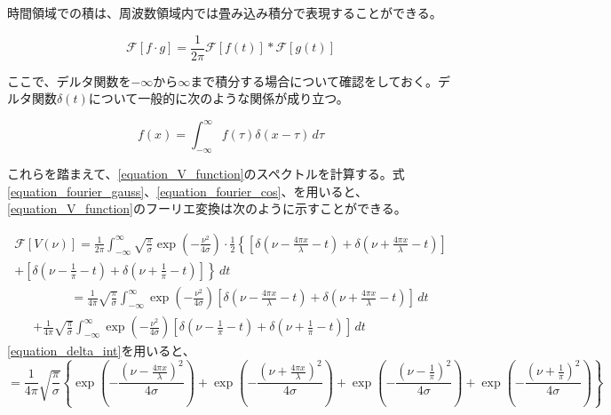 \documentclass[uplatex, titlepage, fontsize=10pt, paper=a4paper]{jsarticle}
\numberwithin{equation}{section}
\begin{document}
時間領域での積は、周波数領域内では畳み込み積分で表現することができる。\cite{mathema_Fourier}

\begin{equation}
    \mathcal{F}\left[f\cdot g\right] = \frac{1}{2\pi}\mathcal{F}\left[f(t)\right]\ast \mathcal{F}\left[g(t)\right]
\end{equation}

ここで、デルタ関数を$-\infty$から$\infty$まで積分する場合について確認をしておく。デルタ関数$\delta(t)$について一般的に次のような関係が成り立つ。

\begin{equation}
    f(x)=\int_{-\infty}^{\infty } f(\tau)\delta(x-\tau) \,d\tau 
    \label{equation_delta_int}
\end{equation}

これらを踏まえて、\eqref{equation_V_function}のスペクトルを計算する。式\ref{equation_fourier_gauss}、\eqref{equation_fourier_cos}、を用いると、\eqref{equation_V_function}のフーリエ変換は次のように示すことができる。

\begin{multline}
    \mathcal{F}\left[V(\nu)\right] = \frac{1}{2\pi}\int_{-\infty}^{\infty}\sqrt{\frac{\pi}{\sigma}}\exp\left({-\frac{\nu^2}{4\sigma}}\right)\cdot \frac{1}{2} \left\{\left[\delta\left(\nu-\frac{4{\pi}x}{\lambda}-t\right)+\delta\left(\nu+\frac{4{\pi}x}{\lambda}-t\right)\right]\right. \\
    +\left.\left[\delta\left(\nu-\frac{1}{\pi}-t\right)+\delta\left(\nu+\frac{1}{\pi}-t\right)\right]\right\}\,dt
\end{multline}
\begin{multline}
    \qquad \quad =\frac{1}{4\pi}\sqrt{\frac{\pi}{\sigma}}\int_{-\infty}^{\infty}\exp\left({-\frac{\nu^2}{4\sigma}}\right)\left[\delta\left(\nu-\frac{4{\pi}x}{\lambda}-t\right)+\delta\left(\nu+\frac{4{\pi}x}{\lambda}-t\right)\right] \,dt\\
    +\frac{1}{4\pi}\sqrt{\frac{\pi}{\sigma}}\int_{-\infty}^{\infty} \exp\left({-\frac{\nu^2}{4\sigma}}\right) \left[\delta\left(\nu-\frac{1}{\pi}-t\right)+\delta\left(\nu+\frac{1}{\pi}-t\right)\right]\,dt 
    \label{equation_fourier_V}
\end{multline}
\vspace{3mm}
\eqref{equation_delta_int}を用いると、
\begin{equation}
    =\frac{1}{4\pi}\sqrt{\frac{\pi}{\sigma}}\left\{\exp\left(-\frac{(\nu-\frac{4{\pi}x}{\lambda})^2}{4\sigma}\right)+\exp\left(-\frac{(\nu+\frac{4{\pi}x}{\lambda})^2}{4\sigma}\right)+\exp\left(-\frac{(\nu-\frac{1}{\pi})^2}{4\sigma}\right)+\exp\left(-\frac{(\nu+\frac{1}{\pi})^2}{4\sigma}\right)\right\}
    \label{equation_fourier_ans}
\end{equation}
\end{document}

